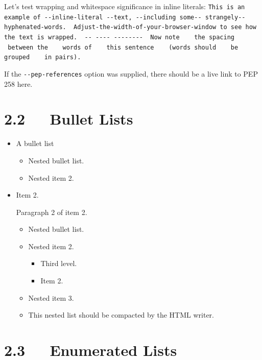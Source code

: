 \documentclass[a4paper]{memoir}
\begin{document}

Let's test wrapping and whitespace significance in inline literals:
\texttt{This is an example of -{}-inline-literal -{}-text, -{}-including some-{}-
strangely-{}-hyphenated-words. ~Adjust-the-width-of-your-browser-window
to see how the text is wrapped. ~-{}- -{}-{}-{}- -{}-{}-{}-{}-{}-{}-{}- ~Now note ~ ~the
spacing ~ ~between the ~ ~words of ~ ~this sentence ~ ~(words
should ~ ~be grouped ~ ~in pairs).}

If the \texttt{-{}-pep-references} option was supplied, there should be a
live link to PEP 258 here.


\section{2.2   Bullet Lists%
  \label{bullet-lists}%
}

\begin{itemize}
\item A bullet list

\begin{itemize}
\item Nested bullet list.

\item Nested item 2.
\end{itemize}

\item Item 2.

Paragraph 2 of item 2.

\begin{itemize}
\item Nested bullet list.

\item Nested item 2.

\begin{itemize}
\item Third level.

\item Item 2.
\end{itemize}

\item Nested item 3.

\item This nested list should be compacted by the HTML writer.
%
\label{target}
\end{itemize}
\end{itemize}


\section{2.3   Enumerated Lists%
  \label{enumerated-lists}%
}
\end{document}
